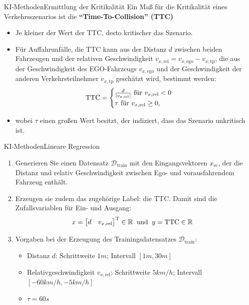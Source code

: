 \documentclass[169, handout	]{THIbeamer} %
\begin{document}
	\begin{frame}{KI-Methoden}{Ermittlung der Kritikalität}
		Ein Maß für die Kritikalität eines Verkehrsszenarios ist die \textbf{\enquote{Time-To-Collision} (TTC)} \\ 
		\begin{itemize}
			\item Je kleiner der Wert der TTC, desto kritischer das Szenario.
			\item Für Auffahrunfälle, die TTC kann aus der Distanz $d$  zwischen beiden Fahrzeugen und der relativen Geschwindigkeit $v_{x,\text{rel}}=v_{x,\text{ego}}-v_{x,\text{tp}}$, die aus der Geschwindigkeit des EGO-Fahrzeugs $v_{x,\text{ego}}$ und der Geschwindigkeit der anderen Verkehrsteilnehmer $v_{x,\text{tp}}$ geschätzt wird, bestimmt werden:
			\begin{equation}
				\text{TTC} = 
				\begin{cases}
					\frac{d}{|v_{\text{x,\text{rel}}}|} \text{ für } v_{x,\text{rel}}<0 \\
					\tau \text{ für } v_{x,\text{rel}} \geq 0 \text{,}
				\end{cases}
			\end{equation}
			\item[] wobei $\tau$ einen großen Wert besitzt, der indiziert, dass das Szenario unkritisch ist.
		\end{itemize}			
	\end{frame}
	\begin{frame}{KI-Methoden}{Lineare Regression}
		\begin{enumerate}
			\item Generieren Sie einen Datensatz $\mathcal{D}_\text{train}$ mit den Eingangsvektoren $x_m$, der die Distanz und relativ Geschwindigkeit zwischen Ego- und vorausfahrendem Fahrzeug enthält. 
			\item Erzeugen sie zudem das zugehörige Label: die TTC. Damit sind die Zufallsvariablen für Ein- und Ausgang:
		\begin{equation}
			x = 			
			\begin{bmatrix}
				d & v_{x,\text{rel}}
			\end{bmatrix}
			^{\text{T}} \in \mathbb{R} 
			\hspace{0.2 cm}
			\text{und}
			\hspace{0.2 cm}			
			y = \text{TTC} \in \mathbb{R}
		\end{equation}
			\item[] Vorgaben bei der Erzeugung des Trainingsdatensatzes $\mathcal{D}_{\text{train}}$:
			\begin{itemize}
				\item Distanz $d$: Schrittweite $1m$; Intervall $[1m, 30m]$ 
				\item Relativgeschwindigkeit $v_{x,\text{rel}}$: Schrittweite $5 km/h$; Intervall $[-60 km/h, -5 km/h]$
				\item $\tau = 60s$
			\end{itemize}			 
		\end{enumerate}
	\end{frame}
\end{document}
